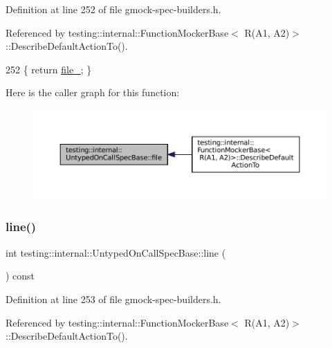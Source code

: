 Definition at line 252 of file gmock-\/spec-\/builders.\+h.



Referenced by testing\+::internal\+::\+Function\+Mocker\+Base$<$ R(\+A1, A2)$>$\+::\+Describe\+Default\+Action\+To().


\begin{DoxyCode}
252 \{ \textcolor{keywordflow}{return} \hyperlink{classtesting_1_1internal_1_1UntypedOnCallSpecBase_adf4e6c5022dfeb482f5328e9bb58ba88}{file\_}; \}
\end{DoxyCode}
Here is the caller graph for this function\+:
\nopagebreak
\begin{figure}[H]
\begin{center}
\leavevmode
\includegraphics[width=350pt]{classtesting_1_1internal_1_1UntypedOnCallSpecBase_a5ccb6ee1208ee597528b44c7c9945fa3_icgraph}
\end{center}
\end{figure}
\mbox{\label{classtesting_1_1internal_1_1UntypedOnCallSpecBase_a18e9eb7155380b3e124bccc0d8115b5e}} 
\subsubsection{\texorpdfstring{line()}{line()}}
{\footnotesize\ttfamily int testing\+::internal\+::\+Untyped\+On\+Call\+Spec\+Base\+::line (\begin{DoxyParamCaption}{ }\end{DoxyParamCaption}) const\hspace{0.3cm}{\ttfamily [inline]}}



Definition at line 253 of file gmock-\/spec-\/builders.\+h.



Referenced by testing\+::internal\+::\+Function\+Mocker\+Base$<$ R(\+A1, A2)$>$\+::\+Describe\+Default\+Action\+To().


